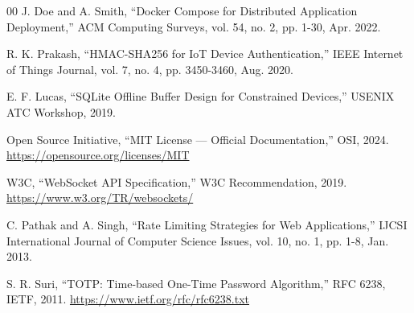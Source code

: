 \begin{thebibliography}{00}
J. Doe and A. Smith, “Docker Compose for Distributed Application Deployment,” ACM Computing Surveys, vol. 54, no. 2, pp. 1-30, Apr. 2022.

R. K. Prakash, “HMAC-SHA256 for IoT Device Authentication,” IEEE Internet of Things Journal, vol. 7, no. 4, pp. 3450-3460, Aug. 2020.

E. F. Lucas, “SQLite Offline Buffer Design for Constrained Devices,” USENIX ATC Workshop, 2019.

Open Source Initiative, “MIT License — Official Documentation,” OSI, 2024. \url{https://opensource.org/licenses/MIT}

W3C, “WebSocket API Specification,” W3C Recommendation, 2019. \url{https://www.w3.org/TR/websockets/}

C. Pathak and A. Singh, “Rate Limiting Strategies for Web Applications,” IJCSI International Journal of Computer Science Issues, vol. 10, no. 1, pp. 1-8, Jan. 2013.

S. R. Suri, “TOTP: Time-based One-Time Password Algorithm,” RFC 6238, IETF, 2011. \url{https://www.ietf.org/rfc/rfc6238.txt}
\end{thebibliography}